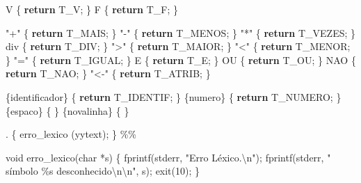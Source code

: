 \documentclass[
  brazilian,
  letterpaper,
]{book}
\newenvironment{Shaded}{\begin{snugshade}}{\end{snugshade}}
\newcommand{\ControlFlowTok}[1]{\textcolor[rgb]{0.00,0.23,0.31}{\textbf{#1}}}
\newcommand{\DataTypeTok}[1]{\textcolor[rgb]{0.68,0.00,0.00}{#1}}
\newcommand{\DecValTok}[1]{\textcolor[rgb]{0.68,0.00,0.00}{#1}}
\newcommand{\NormalTok}[1]{\textcolor[rgb]{0.00,0.23,0.31}{#1}}
\newcommand{\OperatorTok}[1]{\textcolor[rgb]{0.37,0.37,0.37}{#1}}
\newcommand{\SpecialCharTok}[1]{\textcolor[rgb]{0.37,0.37,0.37}{#1}}
\newcommand{\StringTok}[1]{\textcolor[rgb]{0.13,0.47,0.30}{#1}}
\theoremstyle{plain}
\theoremstyle{definition}
\theoremstyle{remark}
\begin{document}
\begin{Shaded}
\begin{Highlighting}[]
\NormalTok{V                 }\OperatorTok{\{} \ControlFlowTok{return}\NormalTok{ T\_V}\OperatorTok{;} \OperatorTok{\}}
\NormalTok{F                 }\OperatorTok{\{} \ControlFlowTok{return}\NormalTok{ T\_F}\OperatorTok{;} \OperatorTok{\}}

\StringTok{"+"}               \OperatorTok{\{} \ControlFlowTok{return}\NormalTok{ T\_MAIS}\OperatorTok{;} \OperatorTok{\}}
\StringTok{"{-}"}               \OperatorTok{\{} \ControlFlowTok{return}\NormalTok{ T\_MENOS}\OperatorTok{;} \OperatorTok{\}}
\StringTok{"*"}               \OperatorTok{\{} \ControlFlowTok{return}\NormalTok{ T\_VEZES}\OperatorTok{;} \OperatorTok{\}}
\NormalTok{div               }\OperatorTok{\{} \ControlFlowTok{return}\NormalTok{ T\_DIV}\OperatorTok{;} \OperatorTok{\}}
\StringTok{"\textgreater{}"}               \OperatorTok{\{} \ControlFlowTok{return}\NormalTok{ T\_MAIOR}\OperatorTok{;} \OperatorTok{\}}
\StringTok{"\textless{}"}               \OperatorTok{\{} \ControlFlowTok{return}\NormalTok{ T\_MENOR}\OperatorTok{;} \OperatorTok{\}}
\StringTok{"="}               \OperatorTok{\{} \ControlFlowTok{return}\NormalTok{ T\_IGUAL}\OperatorTok{;} \OperatorTok{\}}
\NormalTok{E                 }\OperatorTok{\{} \ControlFlowTok{return}\NormalTok{ T\_E}\OperatorTok{;} \OperatorTok{\}}
\NormalTok{OU                }\OperatorTok{\{} \ControlFlowTok{return}\NormalTok{ T\_OU}\OperatorTok{;} \OperatorTok{\}}
\NormalTok{NAO               }\OperatorTok{\{} \ControlFlowTok{return}\NormalTok{ T\_NAO}\OperatorTok{;} \OperatorTok{\}}
\StringTok{"\textless{}{-}"}              \OperatorTok{\{} \ControlFlowTok{return}\NormalTok{ T\_ATRIB}\OperatorTok{;} \OperatorTok{\}}

\OperatorTok{\{}\NormalTok{identificador}\OperatorTok{\}}   \OperatorTok{\{} \ControlFlowTok{return}\NormalTok{ T\_IDENTIF}\OperatorTok{;} \OperatorTok{\}}
\OperatorTok{\{}\NormalTok{numero}\OperatorTok{\}}          \OperatorTok{\{} \ControlFlowTok{return}\NormalTok{ T\_NUMERO}\OperatorTok{;} \OperatorTok{\}}
\OperatorTok{\{}\NormalTok{espaco}\OperatorTok{\}}          \OperatorTok{\{}  \OperatorTok{\}}
\OperatorTok{\{}\NormalTok{novalinha}\OperatorTok{\}}       \OperatorTok{\{}  \OperatorTok{\}}

\OperatorTok{.}                 \OperatorTok{\{}\NormalTok{ erro\_lexico }\OperatorTok{(}\NormalTok{yytext}\OperatorTok{);} \OperatorTok{\}}
\OperatorTok{\%\%}


\DataTypeTok{void}\NormalTok{ erro\_lexico}\OperatorTok{(}\DataTypeTok{char} \OperatorTok{*}\NormalTok{s}\OperatorTok{)} \OperatorTok{\{}
\NormalTok{    fprintf}\OperatorTok{(}\NormalTok{stderr}\OperatorTok{,} \StringTok{"Erro Léxico.}\SpecialCharTok{\textbackslash{}n}\StringTok{"}\OperatorTok{);}
\NormalTok{    fprintf}\OperatorTok{(}\NormalTok{stderr}\OperatorTok{,} \StringTok{"  símbolo }\SpecialCharTok{\%s}\StringTok{ desconhecido}\SpecialCharTok{\textbackslash{}n\textbackslash{}n}\StringTok{"}\OperatorTok{,}\NormalTok{ s}\OperatorTok{);}
\NormalTok{    exit}\OperatorTok{(}\DecValTok{10}\OperatorTok{);}
\OperatorTok{\}}


\end{Highlighting}
\end{Shaded}
\end{document}
